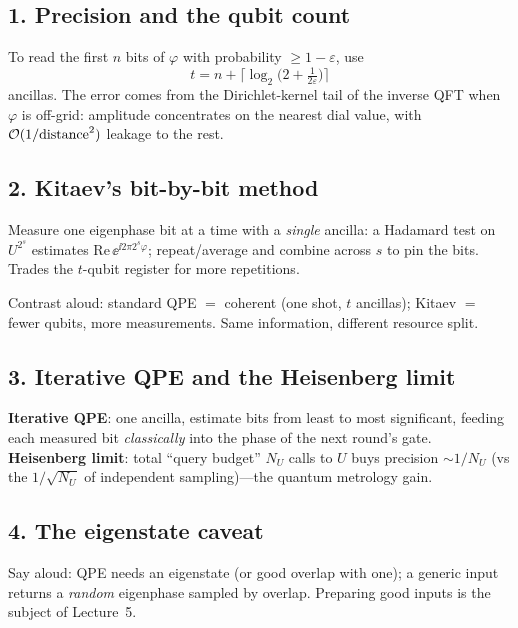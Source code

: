\documentclass[11pt]{article}
\begin{document}
\subsection*{1. Precision and the qubit count }
\begin{board}
To read the first $n$ bits of $\varphi$ with probability $\ge1-\varepsilon$, use
\[
  t=n+\Big\lceil\log_2\!\Big(2+\tfrac1{2\varepsilon}\Big)\Big\rceil
\]
ancillas. The error comes from the Dirichlet-kernel tail of the inverse QFT when $\varphi$
is off-grid: amplitude concentrates on the nearest dial value, with $\mathcal{O}(1/\text{distance}^2)$
leakage to the rest.
\end{board}

\subsection*{2. Kitaev's bit-by-bit method }
\begin{board}
Measure one eigenphase bit at a time with a \emph{single} ancilla: a Hadamard test on
$U^{2^s}$ estimates $\mathrm{Re}\,\ee^{\ii2\pi 2^{s}\varphi}$; repeat/average and combine
across $s$ to pin the bits. Trades the $t$-qubit register for more repetitions.
\end{board}
Contrast aloud: standard QPE $=$ coherent (one shot, $t$ ancillas); Kitaev $=$ fewer
qubits, more measurements. Same information, different resource split.

\subsection*{3. Iterative QPE and the Heisenberg limit }
\begin{board}
\textbf{Iterative QPE}: one ancilla, estimate bits from least to most significant,
feeding each measured bit \emph{classically} into the phase of the next round's gate.
\textbf{Heisenberg limit}: total ``query budget'' $N_U$ calls to $U$ buys precision
$\sim1/N_U$ (vs the $1/\sqrt{N_U}$ of independent sampling)---the quantum metrology gain.
\end{board}

\subsection*{4. The eigenstate caveat }
Say aloud: QPE needs an eigenstate (or good overlap with one); a generic input returns a
\emph{random} eigenphase sampled by overlap. Preparing good inputs is the subject of
Lecture~5.
\end{document}
